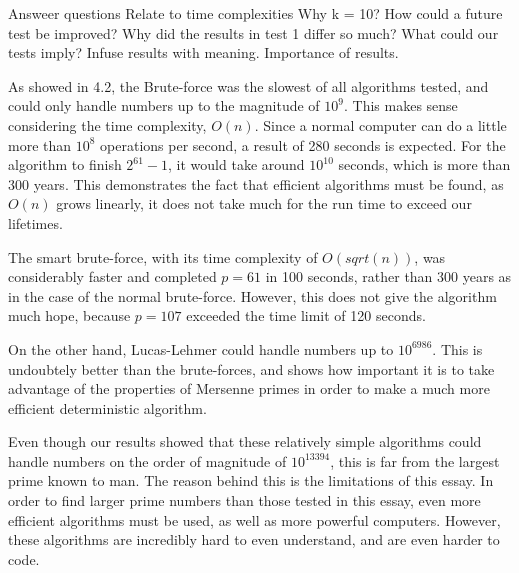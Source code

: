 \documentclass[main.tex]{subfiles}
\begin{document}
Answeer questions
Relate to time complexities
Why k = 10?
How could a future test be improved?
Why did the results in test 1 differ so much?
What could our tests imply?
Infuse results with meaning.
Importance of results.

As showed in 4.2, the Brute-force was the slowest of all algorithms tested, and
could only handle numbers up to the magnitude of $10^{9}$. This makes sense
considering the time complexity, $O(n)$. Since a normal computer can do a little
more than $10^{8}$ operations per second, a result of 280 seconds is expected.
For the algorithm to finish $2^{61}-1$, it would take around $10^{10}$ seconds,
which is more than 300 years. This demonstrates the fact that efficient
algorithms must be found, as $O(n)$ grows linearly, it does not take much for
the run time to exceed our lifetimes.

The smart brute-force, with its time complexity of $O(sqrt(n))$, was
considerably faster and completed $p=61$ in 100 seconds, rather than 300 years
as in the case of the normal brute-force. However, this does not give the
algorithm much hope, because $p=107$ exceeded the time limit of 120 seconds.

On the other hand, Lucas-Lehmer could handle numbers up to $10^{6986}$. This is
undoubtely better than the brute-forces, and shows how important it is to take
advantage of the properties of Mersenne primes in order to make a much more
efficient deterministic algorithm.

Even though our results showed that these relatively simple algorithms could
handle numbers on the order of magnitude of $10^{13394}$, this is far from the
largest prime known to man. The reason behind this is the limitations of this
essay. In order to find larger prime numbers than those tested in this essay,
even more efficient algorithms must be used, as well as more powerful computers.
However, these algorithms are incredibly hard to even understand, and are even
harder to code.

 
\end{document}
